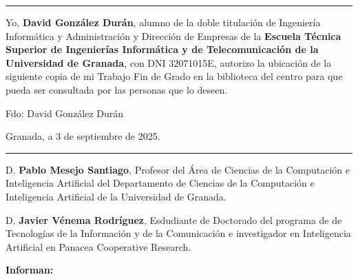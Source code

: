 
\cleardoublepage
\thispagestyle{empty}

\noindent\rule{\textwidth}{2pt}\par\vspace{4.5ex}

Yo, \textbf{David González Durán}, alumno de la doble titulación de Ingeniería Informática y Administración y Dirección de Empresas de la \textbf{Escuela Técnica Superior de Ingenierías Informática y de Telecomunicación de la Universidad de Granada}, con DNI 32071015E, autorizo la ubicación de la siguiente copia de mi Trabajo Fin de Grado en la biblioteca del centro para que pueda ser consultada por las personas que lo deseen.

\vspace{6cm}

\noindent Fdo: David González Durán

\vspace{2cm}

\begin{flushright}
    Granada, a 3 de septiembre de 2025.
\end{flushright}


\cleardoublepage
\thispagestyle{empty}

\noindent\rule{\textwidth}{2pt}\par\vspace{4.5ex}

D. \textbf{Pablo Mesejo Santiago}, Profesor del Área de Ciencias de la Computación e Inteligencia Artificial del Departamento de Ciencias de la Computación e Inteligencia Artificial de la Universidad de Granada.

\vspace{0.5cm}

D. \textbf{Javier Vénema Rodríguez}, Esdudiante de Doctorado del programa de de Tecnologías de la Información y de la Comunicación e investigador en Inteligencia Artificial en Panacea Cooperative Research.

\vspace{0.5cm}

\textbf{Informan:}

\vspace{0.5cm}

